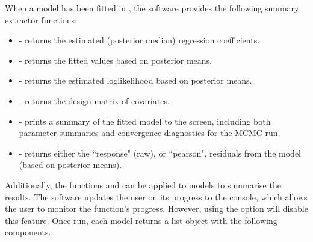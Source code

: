 \documentclass[article, nojss]{jss}
\begin{document}
When a model has been fitted in , the software provides the following summary extractor functions: 


\begin{itemize}
\item {} - returns the estimated (posterior median) regression coefficients. 
\item {} - returns the fitted values based on posterior means.
\item {} - returns the estimated loglikelihood based on posterior means.
\item {} - returns the design matrix of covariates.
\item {} - prints a summary of the fitted model to the screen, including both parameter summaries and convergence diagnostics for the MCMC run.
\item {} - returns either the ``response" (raw), or ``pearson", residuals from the model (based on posterior means).
\end{itemize}

Additionally, the  functions  and  can  be applied to  models to summarise the results. The software updates the user on its progress to the  console, which allows the user to monitor the function's progress. However, using the  option will disable this feature. Once run, each model returns a list object with the following components. 
\end{document}
